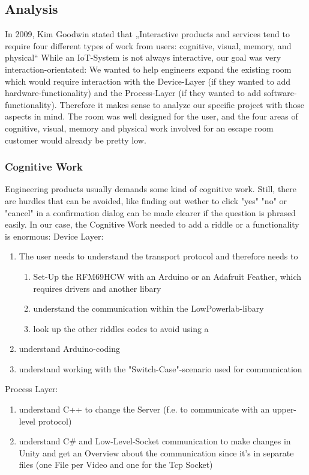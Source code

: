\subsection{Analysis}
In 2009, Kim Goodwin stated that 
„Interactive products and services tend to require four different types of work from users: 
cognitive, visual, memory, and physical“ \parencite{designDigitalAge} 
While an IoT-System is not always interactive, our goal was very interaction-orientated: We wanted to help engineers expand the existing room which would require 
interaction with the Device-Layer (if they wanted to add hardware-functionality) 
and the Process-Layer (if they wanted to add software-functionality).
Therefore it makes sense to analyze our specific project with those aspects in mind. 
The room was well designed for the user, and the four areas of cognitive, visual, memory and physical work involved for an escape room customer would already be pretty low.

\subsubsection{Cognitive Work}
Engineering products usually demands some kind of cognitive work. Still, there are hurdles that can be avoided,
like finding out wether to click "yes" "no" or "cancel" in a confirmation dialog can be made clearer if the question is phrased easily.
In our case, the Cognitive Work needed to add a riddle or a functionality is enormous:
Device Layer:
\begin{enumerate}
    \item The user needs to understand the transport protocol and therefore needs to 
    \begin{enumerate}
        \item Set-Up the RFM69HCW with an Arduino or an Adafruit Feather, which requires drivers and another libary
        \item understand the communication within the LowPowerlab-libary
        \item look up the other riddles codes to avoid using a %
    \end{enumerate}   
    \item understand Arduino-coding 
    \item understand working with the "Switch-Case"-scenario used for communication 
\end{enumerate}  
Process Layer:
\begin{enumerate}
    \item understand C++ to change the Server (f.e. to communicate with an upper-level protocol)
    \item understand C\# and Low-Level-Socket communication to make changes in Unity 
    and get an Overview about the communication since it's in separate files (one File per Video and one for the Tcp Socket) 
\end{enumerate}  


